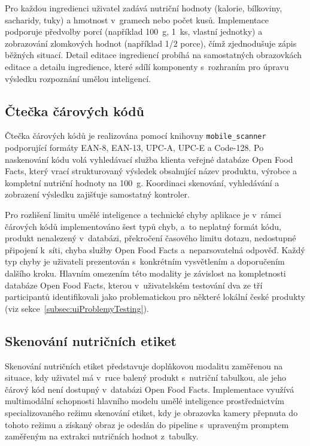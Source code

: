 Pro každou ingredienci uživatel zadává nutriční hodnoty (kalorie, bílkoviny, sacharidy, tuky) a hmotnost v~gramech nebo počet kusů.
Implementace podporuje předvolby porcí (například 100~g, 1~ks, vlastní jednotky) a zobrazování zlomkových hodnot (například 1/2 porce), čímž zjednodušuje zápis běžných situací.
Detail editace ingrediencí probíhá na samostatných obrazovkách editace a detailu ingredience, které sdílí komponenty s~rozhraním pro úpravu výsledku rozpoznání umělou inteligencí.

\subsection{Čtečka čárových kódů}
\label{subsec:carovyKod}

Čtečka čárových kódů je realizována pomocí knihovny \texttt{mobile\_scanner} podporující formáty EAN-8, EAN-13, UPC-A, UPC-E a Code-128.
Po naskenování kódu volá vyhledávací služba klienta veřejné databáze Open Food Facts, který vrací strukturovaný výsledek obsahující název produktu, výrobce a kompletní nutriční hodnoty na 100~g.
Koordinaci skenování, vyhledávání a zobrazení výsledku zajišťuje samostatný kontroler.

Pro rozlišení limitu umělé inteligence a technické chyby aplikace je v~rámci čárových kódů implementováno šest typů chyb, a~to neplatný formát kódu, produkt nenalezený v~databázi, překročení časového limitu dotazu, nedostupné připojení k~síti, chyba služby Open Food Facts a~neparsovatelná odpověď.
Každý typ chyby je uživateli prezentován s~konkrétním vysvětlením a doporučením dalšího kroku.
Hlavním omezením této modality je závislost na kompletnosti databáze Open Food Facts, kterou v~uživatelském testování dva ze tří participantů identifikovali jako problematickou pro některé lokální české produkty (viz sekce~\ref{subsec:uiProblemyTesting}).

\subsection{Skenování nutričních etiket}
\label{subsec:nutricniEtikety}

Skenování nutričních etiket představuje doplňkovou modalitu zaměřenou na situace, kdy uživatel má v~ruce balený produkt s~nutriční tabulkou, ale jeho čárový kód není dostupný v~databázi Open Food Facts.
Implementace využívá multimodální schopnosti hlavního modelu umělé inteligence prostřednictvím specializovaného režimu skenování etiket, kdy je obrazovka kamery přepnuta do tohoto režimu a získaný obraz je odeslán do pipeline s~upraveným promptem zaměřeným na extrakci nutričních hodnot z~tabulky.

